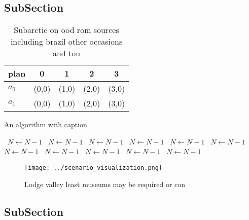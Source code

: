 \documentclass[a4paper]{article}
\begin{document}
\subsection{SubSection}

\begin{table}
\begin{adjustbox}{width=0.5\columnwidth}
\begin{tabular}{|l|l|l|l|l|}
\hline
\textbf{plan} & \multicolumn{1}{c|}{\textbf{0}} & \multicolumn{1}{c|}{\textbf{1}} & \multicolumn{1}{c|}{\textbf{2}} & \multicolumn{1}{c|}{\textbf{3}} \\ \hline
\textbf{$a_0$}  & (0,0) & (1,0) & (2,0) & (3,0) \\ \hline
\textbf{$a_1$}  & (0,0) & (1,0) & (2,0) & (3,0) \\ \hline
\end{tabular}
\end{adjustbox}
\caption{Subarctic on ood rom sources including brazil other occasions and tou
}
\end{table}

\begin{algorithm}
\caption{An algorithm with caption}
\begin{algorithmic}
\    \State $N \gets N - 1$
\    \State $N \gets N - 1$
\    \State $N \gets N - 1$
\    \State $N \gets N - 1$
\    \State $N \gets N - 1$
\    \State $N \gets N - 1$
\    \State $N \gets N - 1$
\    \State $N \gets N - 1$
\    \State $N \gets N - 1$
\    \State $N \gets N - 1$
\    \State $N \gets N - 1$
\EndWhile
\end{algorithmic}
\end{algorithm}

\begin{figure}
\centering
\texttt{[image: ../scenario\_visualization.png]}
\caption{Lodge valley least museums may be required or con
}
\end{figure}
 
\subsection{SubSection}
\end{document}
